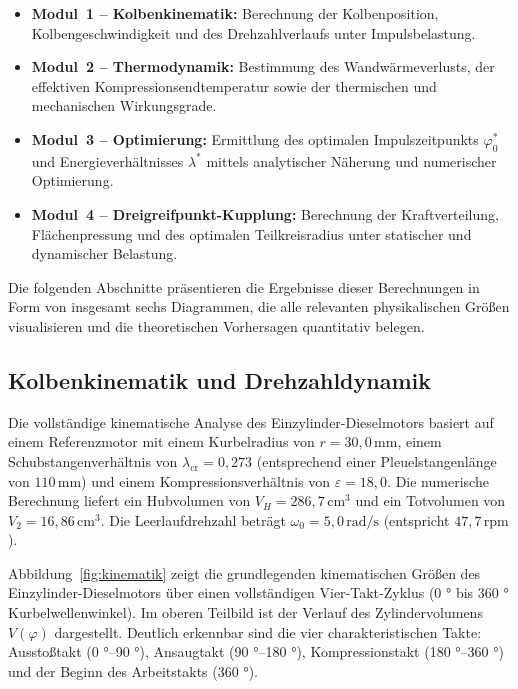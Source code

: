 ﻿\documentclass[a4paper,12pt]{article}
\begin{document}
\begin{itemize}
  \item \textbf{Modul~1 -- Kolbenkinematik:} Berechnung der
    Kolbenposition, Kolbengeschwindigkeit und des Drehzahlverlaufs
    unter Impulsbelastung.
  \item \textbf{Modul~2 -- Thermodynamik:} Bestimmung des Wandwärmeverlusts,
    der effektiven Kompressionsendtemperatur sowie der thermischen und
    mechanischen Wirkungsgrade.
  \item \textbf{Modul~3 -- Optimierung:} Ermittlung des optimalen
    Impulszeitpunkts $\varphi_0^*$ und Energieverhältnisses $\lambda^*$
    mittels analytischer Näherung und numerischer Optimierung.
  \item \textbf{Modul~4 -- Dreigreifpunkt-Kupplung:} Berechnung der
    Kraftverteilung, Flächenpressung und des optimalen Teilkreisradius
    unter statischer und dynamischer Belastung.
\end{itemize}

Die folgenden Abschnitte präsentieren die Ergebnisse dieser Berechnungen
in Form von insgesamt sechs Diagrammen, die alle relevanten physikalischen
Größen visualisieren und die theoretischen Vorhersagen quantitativ belegen.

\subsection{Kolbenkinematik und Drehzahldynamik}

Die vollständige kinematische Analyse des Einzylinder-Dieselmotors basiert
auf einem Referenzmotor mit einem Kurbelradius von $r = 30{,}0\,\text{mm}$,
einem Schubstangenverhältnis von $\lambda_\text{cr} = 0{,}273$ (entsprechend
einer Pleuelstangenlänge von $110\,\text{mm}$) und einem Kompressionsverhältnis
von $\varepsilon = 18{,}0$. Die numerische Berechnung liefert ein Hubvolumen
von $V_H = 286{,}7\,\text{cm}^3$ und ein Totvolumen von $V_2 = 16{,}86\,\text{cm}^3$.
Die Leerlaufdrehzahl beträgt $\omega_0 = 5{,}0\,\text{rad/s}$ (entspricht
$47{,}7\,\text{rpm}$).

Abbildung~\ref{fig:kinematik} zeigt die grundlegenden kinematischen Größen
des Einzylinder-Dieselmotors über einen vollständigen Vier-Takt-Zyklus
(0 ° bis 360 ° Kurbelwellenwinkel). Im oberen Teilbild ist der Verlauf des
Zylindervolumens $V(\varphi)$ dargestellt. Deutlich erkennbar sind die vier
charakteristischen Takte: Ausstoßtakt (0 °--90 °), Ansaugtakt (90 °--180 °),
Kompressionstakt (180 °--360 °) und der Beginn des Arbeitstakts (360 °).
\end{document}
